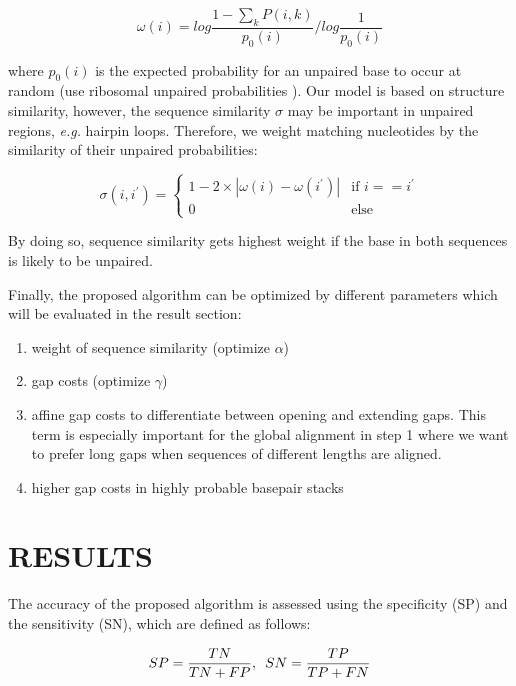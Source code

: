 \documentclass[a4paper,twoside]{article}
\newcommand\eg{\textit{e.g.}}
\begin{document}
\begin{equation}
	\omega(i) = log \frac{1 - \sum_k P(i,k)}{p_0(i)} / log \frac{1}{p_0(i)}
\end{equation}

where $p_0(i)$ is the expected probability for an unpaired base to occur at
random (use ribosomal unpaired probabilities
\cite{Knudsen:Hein:RNA_secon_struc:1999}). Our model is based on structure
similarity, however, the sequence similarity $\sigma$ may be important in
unpaired regions, \eg{} hairpin loops. Therefore, we weight matching nucleotides
by the similarity of their unpaired probabilities:

\begin{equation}
	\sigma(i,i^\prime) = \left\{ \begin{array}{cl}
			1 - 2 \times | \omega(i) - \omega(i^\prime) | & \textrm{if }i == i^\prime \\
			0 & \textrm{else}
		\end{array}\right.
\end{equation}

\noindent By doing so, sequence similarity gets highest weight if the base in both
sequences is likely to be unpaired.

Finally, the proposed algorithm can be optimized by different parameters which
will be evaluated in the result section:

\begin{enumerate}
\item weight of sequence similarity (optimize $\alpha$)
\item gap costs (optimize $\gamma$)
\item affine gap costs to differentiate between opening and extending gaps. This term is especially important for the global alignment in step 1 where we want to prefer long gaps when sequences of different lengths are aligned.
\item higher gap costs in highly probable basepair stacks
\end{enumerate}


\section{\uppercase{Results}}

\noindent The accuracy of the proposed algorithm is assessed using the
specificity (SP) and the sensitivity (SN), which are defined as follows:

\begin{equation}\label{eq5}
	SP = \frac{TN}{TN + FP}, \hspace{5px} SN = \frac{TP}{TP + FN}
\end{equation}
\end{document}
